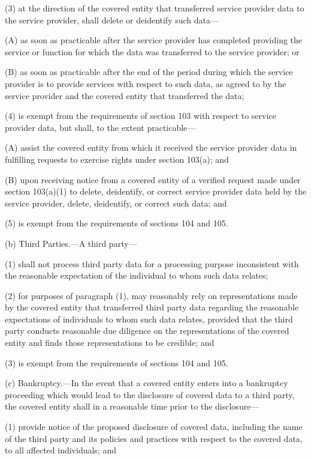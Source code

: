 (3) at the direction of the covered entity that transferred service provider data to the service provider, shall delete or deidentify such data—

(A) as soon as practicable after the service provider has completed providing the service or function for which the data was transferred to the service provider; or

(B) as soon as practicable after the end of the period during which the service provider is to provide services with respect to such data, as agreed to by the service provider and the covered entity that transferred the data;

(4) is exempt from the requirements of section 103 with respect to service provider data, but shall, to the extent practicable—

(A) assist the covered entity from which it received the service provider data in fulfilling requests to exercise rights under section 103(a); and

(B) upon receiving notice from a covered entity of a verified request made under section 103(a)(1) to delete, deidentify, or correct service provider data held by the service provider, delete, deidentify, or correct such data; and

(5) is exempt from the requirements of sections 104 and 105.

(b) Third Parties.—A third party—

(1) shall not process third party data for a processing purpose inconsistent with the reasonable expectation of the individual to whom such data relates;

(2) for purposes of paragraph (1), may reasonably rely on representations made by the covered entity that transferred third party data regarding the reasonable expectations of individuals to whom such data relates, provided that the third party conducts reasonable due diligence on the representations of the covered entity and finds those representations to be credible; and

(3) is exempt from the requirements of sections 104 and 105.

(c) Bankruptcy.—In the event that a covered entity enters into a bankruptcy proceeding which would lead to the disclosure of covered data to a third party, the covered entity shall in a reasonable time prior to the disclosure—

(1) provide notice of the proposed disclosure of covered data, including the name of the third party and its policies and practices with respect to the covered data, to all affected individuals; and

